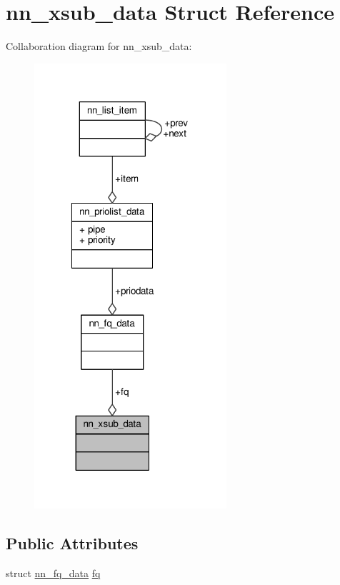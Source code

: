 \hypertarget{structnn__xsub__data}{}\section{nn\+\_\+xsub\+\_\+data Struct Reference}
\label{structnn__xsub__data}


Collaboration diagram for nn\+\_\+xsub\+\_\+data\+:\nopagebreak
\begin{figure}[H]
\begin{center}
\leavevmode
\includegraphics[width=202pt]{structnn__xsub__data__coll__graph}
\end{center}
\end{figure}
\subsection*{Public Attributes}
\begin{DoxyCompactItemize}
\item 
struct \hyperlink{structnn__fq__data}{nn\+\_\+fq\+\_\+data} \hyperlink{structnn__xsub__data_ac51715c35045378f68ac4ee64e426cac}{fq}
\end{DoxyCompactItemize}


